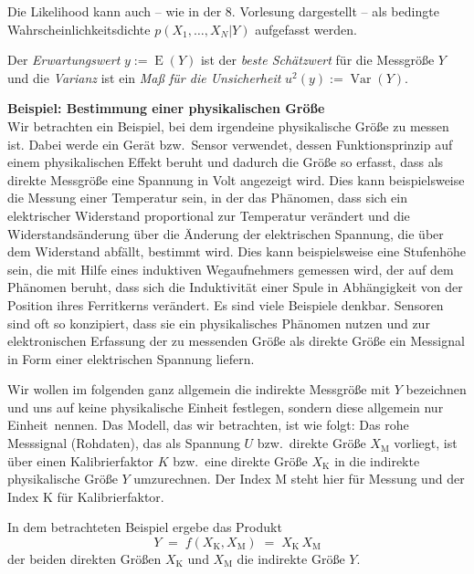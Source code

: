 Die Likelihood kann auch -- wie in der 8. Vorlesung dargestellt -- als bedingte Wahrscheinlichkeitsdichte $p(X_1,\ldots,X_N|Y)$ aufgefasst werden. 

Der \textsl{Erwartungswert} $y := \operatorname{E}(Y)$ ist der \textsl{beste Schätzwert} für die Messgröße $Y$ und die \textsl{Varianz} ist ein 
\textsl{Maß für die Unsicherheit} $u^2(y) := \operatorname{Var}(Y)$.

\textbf{Beispiel: Bestimmung einer physikalischen Größe}\\
Wir betrachten ein Beispiel, bei dem irgendeine physikalische Größe zu messen ist.
Dabei werde ein Gerät bzw.\ Sensor verwendet, dessen Funktionsprinzip auf einem
physikalischen Effekt beruht und dadurch die Größe so erfasst,
dass als direkte Messgröße eine Spannung in Volt angezeigt wird. Dies kann beispielsweise
die Messung einer Temperatur sein, in der das Phänomen, dass sich ein elektrischer
Widerstand proportional zur Temperatur verändert und die Widerstandsänderung über die
Änderung der elektrischen Spannung, die über dem Widerstand abfällt, bestimmt wird.
Dies kann beispielsweise eine Stufenhöhe sein, die mit Hilfe eines induktiven Wegaufnehmers
gemessen wird, der auf dem Phänomen beruht, dass sich die Induktivität einer Spule in Abhängigkeit
von der  Position ihres Ferritkerns verändert. Es sind viele Beispiele denkbar. Sensoren
sind oft so konzipiert, dass sie ein physikalisches Phänomen nutzen und zur elektronischen
Erfassung der zu messenden Größe als direkte Größe ein Messignal in Form einer elektrischen
Spannung liefern.

Wir wollen im folgenden ganz allgemein die indirekte Messgröße mit $Y$
bezeichnen und uns auf keine physikalische Einheit festlegen, sondern diese allgemein nur
\glqq Einheit\grqq ~nennen. Das Modell, das wir betrachten, ist wie folgt: Das rohe Messsignal (Rohdaten),
das als Spannung $U$ bzw.\ direkte Größe $X_\mathrm{M}$ vorliegt, ist über
einen Kalibrierfaktor $K$ bzw.\ eine direkte Größe $X_\mathrm{K}$
in die indirekte physikalische Größe $Y$ umzurechnen. 
Der Index M steht hier für Messung und der Index K für Kalibrierfaktor.

In dem betrachteten Beispiel
ergebe das Produkt
\begin{equation}
Y \; = \; f(X_\mathrm{K}, X_\mathrm{M})  \; = \; X_\mathrm{K} \, X_\mathrm{M}
\end{equation}
der beiden direkten Größen $X_\mathrm{K}$ und $X_\mathrm{M}$ die indirekte Größe $Y$.


